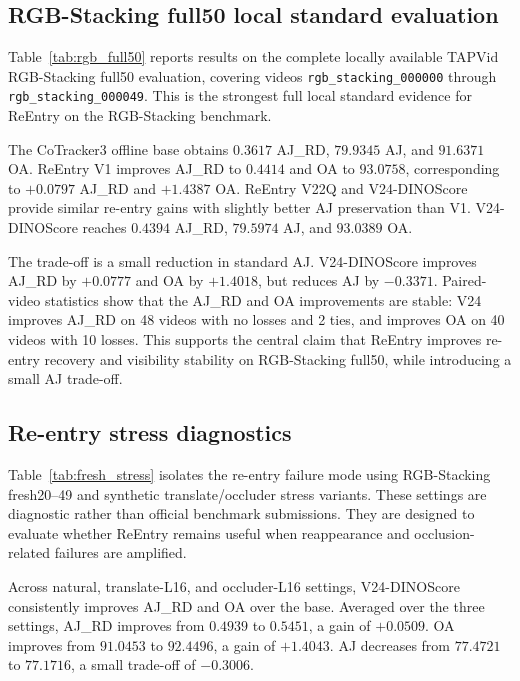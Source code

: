 \subsection{RGB-Stacking full50 local standard evaluation}
\label{sec:rgb_full50}

Table~\ref{tab:rgb_full50} reports results on the complete locally available TAPVid RGB-Stacking full50 evaluation, covering videos \texttt{rgb\_stacking\_000000} through \texttt{rgb\_stacking\_000049}. This is the strongest full local standard evidence for ReEntry on the RGB-Stacking benchmark.

The CoTracker3 offline base obtains $0.3617$ AJ\_RD, $79.9345$ AJ, and $91.6371$ OA. ReEntry V1 improves AJ\_RD to $0.4414$ and OA to $93.0758$, corresponding to $+0.0797$ AJ\_RD and $+1.4387$ OA. ReEntry V22Q and V24-DINOScore provide similar re-entry gains with slightly better AJ preservation than V1. V24-DINOScore reaches $0.4394$ AJ\_RD, $79.5974$ AJ, and $93.0389$ OA.

The trade-off is a small reduction in standard AJ. V24-DINOScore improves AJ\_RD by $+0.0777$ and OA by $+1.4018$, but reduces AJ by $-0.3371$. Paired-video statistics show that the AJ\_RD and OA improvements are stable: V24 improves AJ\_RD on 48 videos with no losses and 2 ties, and improves OA on 40 videos with 10 losses. This supports the central claim that ReEntry improves re-entry recovery and visibility stability on RGB-Stacking full50, while introducing a small AJ trade-off.

\subsection{Re-entry stress diagnostics}
\label{sec:stress_diagnostics}

Table~\ref{tab:fresh_stress} isolates the re-entry failure mode using RGB-Stacking fresh20--49 and synthetic translate/occluder stress variants. These settings are diagnostic rather than official benchmark submissions. They are designed to evaluate whether ReEntry remains useful when reappearance and occlusion-related failures are amplified.

Across natural, translate-L16, and occluder-L16 settings, V24-DINOScore consistently improves AJ\_RD and OA over the base. Averaged over the three settings, AJ\_RD improves from $0.4939$ to $0.5451$, a gain of $+0.0509$. OA improves from $91.0453$ to $92.4496$, a gain of $+1.4043$. AJ decreases from $77.4721$ to $77.1716$, a small trade-off of $-0.3006$.

